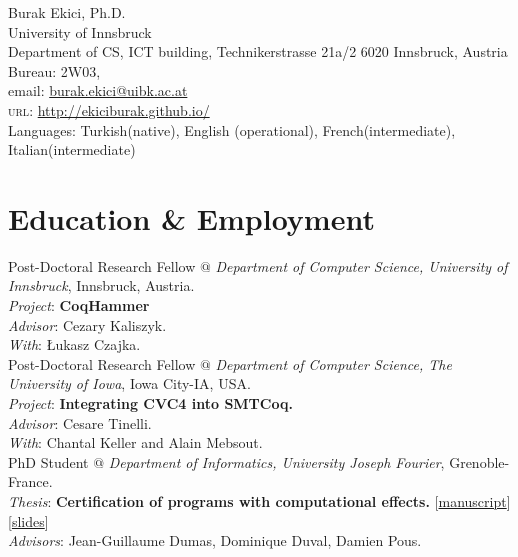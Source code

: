 \documentclass[12pt, a4paper]{article}
\newcommand{\years}[1]{\marginnote{\scriptsize #1}}
\begin{document}
{\LARGE Burak Ekici, Ph.D.}\\[0.25cm]
University of Innsbruck\\
Department of CS, ICT building, Technikerstrasse 21a/2 6020 Innsbruck, Austria \\
Bureau:  2W03,\\
email: \href{mailto:burak.ekici@uibk.ac.at}{burak.ekici@uibk.ac.at}\\
\textsc{url}: \href{http://ekiciburak.github.io/}{http://ekiciburak.github.io/}\\ [0.1cm]
Languages: Turkish(native), English (operational), French(intermediate), Italian(intermediate)

\section*{Education \& Employment}

\years{\normalsize2018-now} Post-Doctoral Research Fellow $@$ \textit{Department of Computer Science, University of Innsbruck}, Innsbruck, Austria.\\
\emph{Project}: \textbf{CoqHammer}\\
\emph{Advisor}: Cezary Kaliszyk.\\
\emph{With}: \L ukasz Czajka.\\

\years{\normalsize2016-2017} Post-Doctoral Research Fellow $@$ \textit{Department of Computer Science, The University of Iowa}, Iowa City-IA, USA.\\
\emph{Project}: \textbf{Integrating CVC4 into SMTCoq.}\\
\emph{Advisor}: Cesare Tinelli.\\
\emph{With}: Chantal Keller and Alain Mebsout.\\

\years{\normalsize2013-2015} PhD Student $@$ \textit{Department of Informatics, University Joseph Fourier}, Grenoble-France.\\
\emph{Thesis}: \textbf{Certification of programs with computational effects.}
 [\href{https://tel.archives-ouvertes.fr/tel-01250842v1/document}{manuscript}]
 [\href{http://ljk.imag.fr/membres/Burak.Ekici/PHDTHESIS/ekici_defense_slides.pdf}{slides}]
 \\
\emph{Advisors}: Jean-Guillaume Dumas, Dominique Duval, Damien Pous.\\
\end{document}
